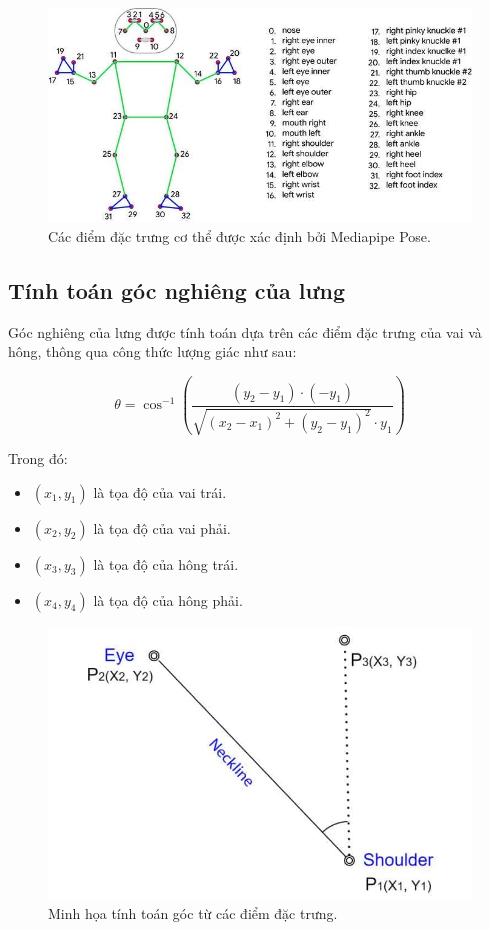 \documentclass[conference]{IEEEtran}
\begin{document}
\begin{figure}[h]
    \centering
    \includegraphics[width=0.8\linewidth]{images/body_keypoints.png}
    \caption{Các điểm đặc trưng cơ thể được xác định bởi Mediapipe Pose.}
    \label{fig:body_keypoints}
\end{figure}

\subsection{Tính toán góc nghiêng của lưng}
Góc nghiêng của lưng được tính toán dựa trên các điểm đặc trưng của vai và hông, thông qua công thức lượng giác như sau:

\begin{equation}
\theta = \cos^{-1}\left( \frac{(y_2 - y_1) \cdot (-y_1)}{\sqrt{(x_2 - x_1)^2 + (y_2 - y_1)^2} \cdot y_1} \right)
\end{equation}

Trong đó:
\begin{itemize}
    \item $(x_1, y_1)$ là tọa độ của vai trái.
    \item $(x_2, y_2)$ là tọa độ của vai phải.
    \item $(x_3, y_3)$ là tọa độ của hông trái.
    \item $(x_4, y_4)$ là tọa độ của hông phải.
\end{itemize}

\begin{figure}[h]
    \centering
    \includegraphics[width=0.9\linewidth]{images/angle_calculation.png}
    \caption{Minh họa tính toán góc từ các điểm đặc trưng.}
    \label{fig:angle_calculation}
\end{figure}
\end{document}
